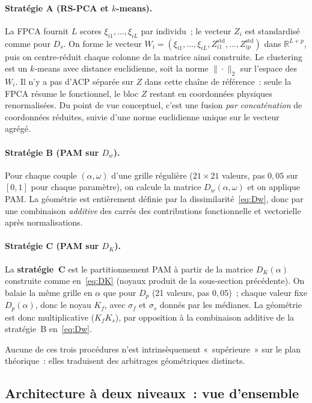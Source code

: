 \documentclass[11pt,a4paper]{article}
\newcommand{\Dw}{D_w}
\newcommand{\DK}{D_K}
\newcommand{\Dp}{D_p}
\begin{document}
\paragraph{Stratégie A (RS-PCA et $k$-means).}
La FPCA fournit $L$ scores $\xi_{i1},\ldots,\xi_{iL}$ par individu~; le vecteur
$Z_i$ est standardisé comme pour $D_s$. On forme le vecteur
$W_i = (\xi_{i1},\ldots,\xi_{iL},Z_{i1}^{\mathrm{std}},\ldots,Z_{ip}^{\mathrm{std}})$
dans $\mathbb{R}^{L+p}$, puis on centre-réduit chaque colonne de la matrice ainsi
construite. Le clustering est un $k$-means avec distance euclidienne, soit la
norme $\|\cdot\|_2$ sur l'espace des $W_i$. Il n'y a pas d'ACP séparée sur $Z$
dans cette chaîne de référence~: seule la FPCA résume le fonctionnel, le bloc
$Z$ restant en coordonnées physiques renormalisées. Du point de vue conceptuel,
c'est une fusion \emph{par concaténation} de coordonnées réduites, suivie d'une
norme euclidienne unique sur le vecteur agrégé.

\paragraph{Stratégie B (PAM sur $\Dw$).}
Pour chaque couple $(\alpha,\omega)$ d'une grille régulière ($21\times 21$
valeurs, pas $0{,}05$ sur $[0,1]$ pour chaque paramètre), on calcule la
matrice $\Dw(\alpha,\omega)$ et on applique PAM. La géométrie est entièrement
définie par la dissimilarité~\eqref{eq:Dw}, donc par une combinaison
\emph{additive} des carrés des contributions fonctionnelle et vectorielle après
normalisations.

\paragraph{Stratégie C (PAM sur $\DK$).}
La \textbf{stratégie~C} est le partitionnement PAM à partir de la matrice
$\DK(\alpha)$ construite comme en~\eqref{eq:DK} (noyaux produit de la
sous-section précédente). On balaie la même grille en $\alpha$ que pour $\Dp$
(21 valeurs, pas $0{,}05$)~; chaque valeur fixe $\Dp(\alpha)$, donc le noyau
$K_f$, avec $\sigma_f$ et $\sigma_s$ donnés par les médianes. La géométrie est
donc multiplicative ($K_fK_s$), par opposition à la combinaison additive de la
stratégie~B en~\eqref{eq:Dw}.

Aucune de ces trois procédures n'est intrinsèquement «~supérieure~» sur le plan
théorique~: elles traduisent des arbitrages géométriques distincts.

\subsection{Architecture à deux niveaux~: vue d'ensemble}
\end{document}
